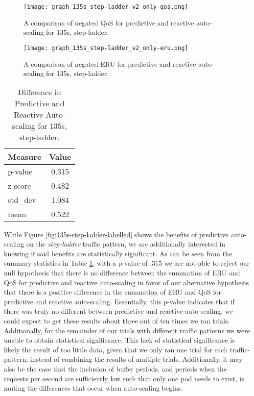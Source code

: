 \begin{figure}[!tbp]
  \centering
  \begin{minipage}[b]{0.4\textwidth}
    \texttt{[image: graph\_135s\_step-ladder\_v2\_only-qos.png]}
    \caption{A comparison of negated QoS for predictive and reactive
    auto-scaling for 135s, step-ladder.}
    \label{fig:135s-step-ladder-only-qos}
  \end{minipage}
  \hfill
  \begin{minipage}[b]{0.4\textwidth}
    \texttt{[image: graph\_135s\_step-ladder\_v2\_only-eru.png]}
    \caption{A comparison of negated ERU for predictive and reactive
    auto-scaling for 135s, step-ladder.}
    \label{fig:135s-step-ladder-only-eru}
  \end{minipage}
\end{figure}

\begin{table}[!b]
  \centering
  \caption{Difference in Predictive and Reactive Auto-scaling for 135s,
  step-ladder.}
  \label{tab:135s-step-ladder}
\begin{tabular}{l c}\hline\hline
    \multicolumn{1}{c}{\textbf{Measure}} & \textbf{Value} \\ \hline
     p-value & 0.315 \\
     z-score & 0.482 \\
     std\_dev & 1.084 \\
     mean & 0.522
  \end{tabular}
\end{table}

While Figure \ref{fig:135s-step-ladder-labelled} shows the benefits of predictive
auto-scaling on the \textit{step-ladder} traffic pattern,
we are additionally interested in knowing if said benefits are
statistically significant.
As can be seen from the summary statistics in Table \ref{tab:135s-step-ladder},
with a p-value of .315 we are not
able to reject our null hypothesis that there is no difference between the
summation of ERU and QoS for predictive and reactive auto-scaling in favor of
our alternative hypothesis that there is a positive difference in the summation
of ERU and QoS for predictive and reactive auto-scaling. Essentially, this
p-value indicates that if there was truly no different between predictive and
reactive auto-scaling, we could expect to get these results about three out of
ten times we ran trials. Additionally, for the remainder of our trials with
different traffic patterns we were unable to obtain statistical significance.
This lack of statistical significance is likely the result of too little data,
given that we only ran one trial for each traffic-pattern, instead of combining
the results of multiple trials. Additionally, it may also be the case that the
inclusion of buffer periods, and periods when the requests per second are
sufficiently low such that only one pod needs to exist, is muting the
differences that occur when auto-scaling begins.
